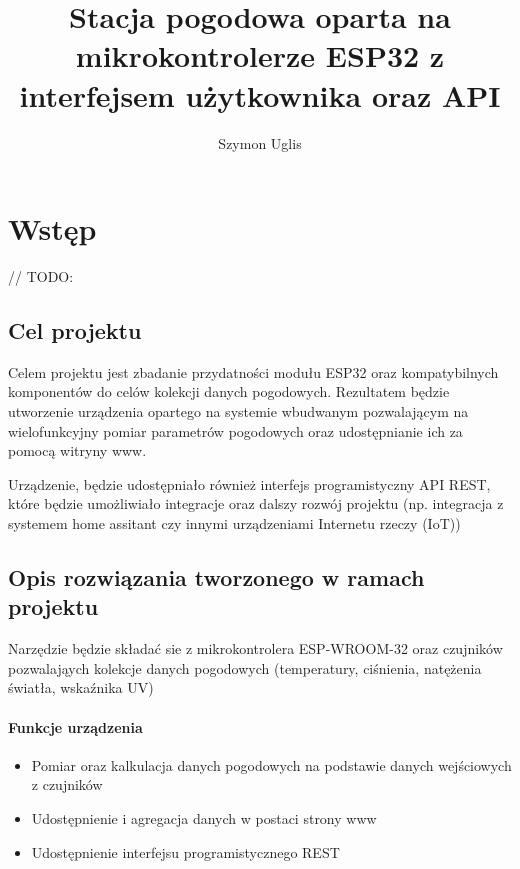 \documentclass[12pt,a4paper]{article}
\title{Stacja pogodowa oparta na mikrokontrolerze ESP32 z interfejsem użytkownika oraz API}
\author{Szymon Uglis}
\begin{document}

\tableofcontents{}
\pagebreak

\section{Wstęp}

// TODO:

\subsection{Cel projektu}

Celem projektu jest zbadanie przydatności modułu ESP32 oraz kompatybilnych komponentów do celów kolekcji danych pogodowych. 
Rezultatem będzie utworzenie urządzenia opartego na systemie wbudwanym pozwalającym na wielofunkcyjny pomiar parametrów pogodowych oraz udostępnianie ich za pomocą witryny www.

Urządzenie, będzie udostępniało również interfejs programistyczny API REST, które będzie umożliwiało integracje oraz dalszy rozwój projektu 
(np. integracja z systemem home assitant czy innymi urządzeniami Internetu rzeczy (IoT))

\subsection{Opis rozwiązania tworzonego w ramach projektu}

Narzędzie będzie składać sie z mikrokontrolera ESP-WROOM-32 oraz czujników pozwalająych kolekcje danych pogodowych (temperatury, ciśnienia, natężenia światła, wskaźnika UV)

\paragraph{Funkcje urządzenia}
\begin{itemize}
    \item Pomiar oraz kalkulacja danych pogodowych na podstawie danych wejściowych z czujników
    \item Udostępnienie i agregacja danych w postaci strony www
    \item Udostępnienie interfejsu programistycznego REST 
\end{itemize}
\end{document}
